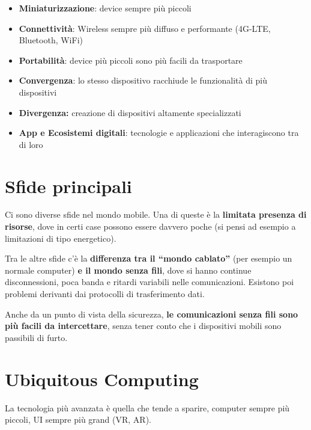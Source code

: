 \begin{itemize}
\item \textbf{Miniaturizzazione}: device sempre più piccoli

\item \textbf{Connettività}: Wireless sempre più diffuso e performante
  (4G-LTE, Bluetooth, WiFi)

\item \textbf{Portabilità}: device più piccoli sono più facili da
  trasportare

\item \textbf{Convergenza}: lo stesso dispositivo racchiude le funzionalità
  di più dispositivi

\item \textbf{Divergenza:} creazione di dispositivi altamente specializzati

\item \textbf{App e Ecosistemi digitali}: tecnologie e applicazioni che
  interagiscono tra di loro

\end{itemize}

\section{Sfide principali}

Ci sono diverse sfide nel mondo mobile. Una di  queste è la \textbf{limitata
presenza di risorse}, dove in certi case possono essere davvero poche (si pensi
ad esempio a limitazioni di tipo energetico).

Tra le altre sfide c'è la \textbf{differenza tra il ``mondo cablato''} (per
esempio un normale computer) \textbf{e il mondo senza fili}, dove si hanno
continue disconnessioni, poca banda e ritardi variabili nelle comunicazioni.
Esistono poi problemi derivanti dai protocolli di trasferimento dati.

Anche da un punto di vista della sicurezza, \textbf{le comunicazioni senza fili
sono più facili da intercettare}, senza tener conto che i dispositivi mobili
sono passibili di furto.

\section{Ubiquitous Computing }
\label{ubiquitous-computing}

La tecnologia più avanzata è quella che tende a sparire, computer sempre
più piccoli, UI sempre più grand (VR, AR).

